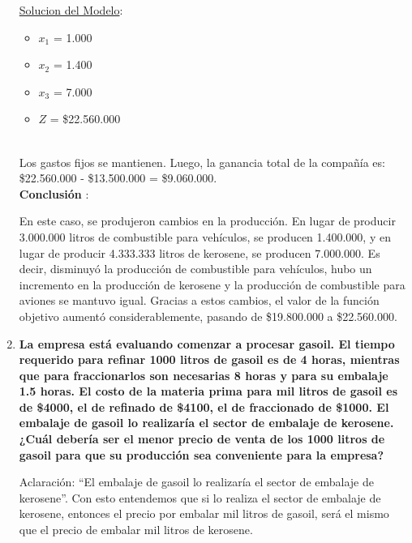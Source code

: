 \documentclass[10pt,a4paper]{article}
\begin{document}
\begin{enumerate}[label=\textbf{\sffamily\large\arabic*.}]
\begin{itemize}
    \end{itemize}

    \underline{Solucion del Modelo}: 

    \begin{itemize}

        \item $x_{1}$ = 1.000
        \item $x_{2}$ = 1.400
        \item $x_{3}$ = 7.000
        \item $Z$ = \$22.560.000\\

    \end{itemize}
    \\
    Los gastos fijos se mantienen. Luego, la ganancia total de la compañía es: \$22.560.000 - \$13.500.000 = \$9.060.000. \\

    \textbf{Conclusión }:
    
    En este caso, se produjeron cambios en la producción. En lugar de producir 3.000.000 litros de combustible para vehículos, se producen 1.400.000, y en lugar de producir 4.333.333 litros de kerosene, se producen 7.000.000. \newline
    Es decir, disminuyó la producción de combustible para vehículos, hubo un incremento en la producción de kerosene y la producción de combustible para aviones se mantuvo igual. Gracias a estos cambios, el valor de la función objetivo aumentó considerablemente, pasando de \$19.800.000 a \$22.560.000. \\

    
    \item {\bfseries\large La empresa está evaluando comenzar a procesar gasoil. El tiempo requerido para refinar 1000 litros de gasoil
    es de 4 horas, mientras que para fraccionarlos son necesarias 8 horas y para su embalaje 1.5 horas. El costo
    de la materia prima para mil litros de gasoil es de \$4000, el de refinado de \$4100, el de fraccionado de \$1000.
    El embalaje de gasoil lo realizaría el sector de embalaje de kerosene. ¿Cuál debería ser el menor precio de
    venta de los 1000 litros de gasoil para que su producción sea conveniente para la empresa?}

    \vspace{1em}

    Aclaración: ``El embalaje de gasoil lo realizaría el sector de embalaje de kerosene''. Con esto entendemos que si lo realiza el sector de embalaje de kerosene, entonces el precio por embalar mil litros de gasoil, será el mismo que el precio de embalar mil litros de kerosene. 



\end{enumerate}
\end{document}
